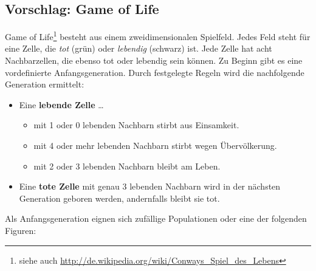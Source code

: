 \subsection*{Vorschlag: Game of Life}
\glqq{}Game of Life\grqq{}\footnote{siehe auch \url{http://de.wikipedia.org/wiki/Conways_Spiel_des_Lebens}} besteht aus einem zweidimensionalen Spielfeld.
Jedes Feld steht für eine Zelle, die \textit{tot} (grün) oder \textit{lebendig} (schwarz) ist.
Jede Zelle hat acht Nachbarzellen, die ebenso tot oder lebendig sein können.
Zu Beginn gibt es eine vordefinierte Anfangsgeneration.
%
Durch festgelegte Regeln wird die nachfolgende Generation ermittelt:
\begin{itemize}
	\item Eine \textbf{lebende Zelle} \dots
	\begin{itemize}
		\item mit 1 oder 0 lebenden Nachbarn stirbt aus Einsamkeit.
		\item mit 4 oder mehr lebenden Nachbarn stirbt wegen Übervölkerung.
		\item mit 2 oder 3 lebenden Nachbarn bleibt am Leben.
	\end{itemize}
	\item Eine \textbf{tote Zelle} mit genau 3 lebenden Nachbarn wird in der nächsten Generation geboren werden, andernfalls bleibt sie tot.
\end{itemize}
%
Als Anfangsgeneration eignen sich zufällige Populationen oder eine der folgenden Figuren:
